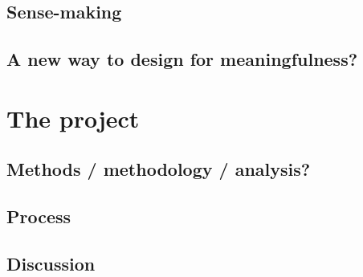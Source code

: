 \documentclass[UKenglish]{ifimaster}
\begin{document}
\chapter{Sense-making}

\chapter{A new way to design for meaningfulness?}


\part{The project}
\chapter{Methods / methodology / analysis?}

\chapter{Process}


\chapter{Discussion}


\backmatter{}
\printbibliography

%
\end{document}
